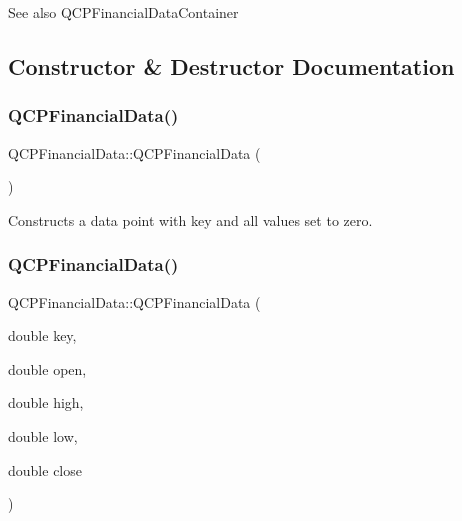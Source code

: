 \begin{DoxySeeAlso}{See also}
Q\+C\+P\+Financial\+Data\+Container 
\end{DoxySeeAlso}


\subsection{Constructor \& Destructor Documentation}
\mbox{\label{class_q_c_p_financial_data_a1ca53b3a9ae4e9658a4fd1ca57d76ba4}} 
\subsubsection{\texorpdfstring{Q\+C\+P\+Financial\+Data()}{QCPFinancialData()}\hspace{0.1cm}{\footnotesize\ttfamily [1/2]}}
{\footnotesize\ttfamily Q\+C\+P\+Financial\+Data\+::\+Q\+C\+P\+Financial\+Data (\begin{DoxyParamCaption}{ }\end{DoxyParamCaption})}

Constructs a data point with key and all values set to zero. \mbox{\label{class_q_c_p_financial_data_a069b72c514dfd4fc8e1d5df811e54ca4}} 
\subsubsection{\texorpdfstring{Q\+C\+P\+Financial\+Data()}{QCPFinancialData()}\hspace{0.1cm}{\footnotesize\ttfamily [2/2]}}
{\footnotesize\ttfamily Q\+C\+P\+Financial\+Data\+::\+Q\+C\+P\+Financial\+Data (\begin{DoxyParamCaption}\item[{double}]{key,  }\item[{double}]{open,  }\item[{double}]{high,  }\item[{double}]{low,  }\item[{double}]{close }\end{DoxyParamCaption})}


